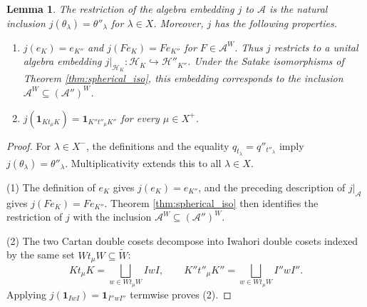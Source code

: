\documentclass[12pt]{article}
\numberwithin{equation}{section}
\newtheorem{lemma}[theorem]{Lemma}
\theoremstyle{definition}
\theoremstyle{remark}
\theoremstyle{plain}
\begin{document}
\begin{lemma}\label{lem:j_embedding}
The restriction of the algebra embedding $j$ to $\mathcal A$ is the natural inclusion $j(\theta_\lambda)=\theta''_\lambda$ for $\lambda\in X$. Moreover, $j$ has the following properties.
\begin{enumerate}
\item $j(e_K) = e_{K''}$ and $j(F e_K) = F e_{K''}$ for $F \in \mathcal{A}^W$. Thus $j$ restricts to a unital algebra embedding $j|_{\mathcal{H}_K} : \mathcal{H}_K \hookrightarrow \mathcal{H}''_{K''}$. Under the Satake isomorphisms of Theorem \ref{thm:spherical_iso}, this embedding corresponds to the inclusion $\mathcal{A}^W \subseteq (\mathcal{A}'')^W$.
\item $j(\mathbf{1}_{K t_\mu K}) = \mathbf{1}_{K'' t''_\mu K''}$ for every $\mu \in X^+$.
\end{enumerate}
\end{lemma}
\begin{proof}
For $\lambda \in X^-$, the definitions and the equality $q_{t_\lambda} = q''_{t''_\lambda}$ imply $j(\theta_\lambda) = \theta''_\lambda$. Multiplicativity extends this to all $\lambda \in X$.

(1) The definition of $e_K$ gives $j(e_K) = e_{K''}$, and the preceding description of $j|_{\mathcal A}$ gives $j(Fe_K)=Fe_{K''}$. Theorem \ref{thm:spherical_iso} then identifies the restriction of $j$ with the inclusion $\mathcal A^W\subseteq(\mathcal A'')^W$.

(2) The two Cartan double cosets decompose into Iwahori double cosets indexed by the same set $Wt_\mu W \subseteq \widetilde{W}$:
$$K t_\mu K = \bigsqcup_{w \in W t_\mu W} IwI, \qquad K'' t''_\mu K'' = \bigsqcup_{w \in W t_\mu W} I''wI''.$$
Applying $j(\mathbf 1_{IwI})=\mathbf 1_{I''wI''}$ termwise proves (2).
\end{proof}
\end{document}
